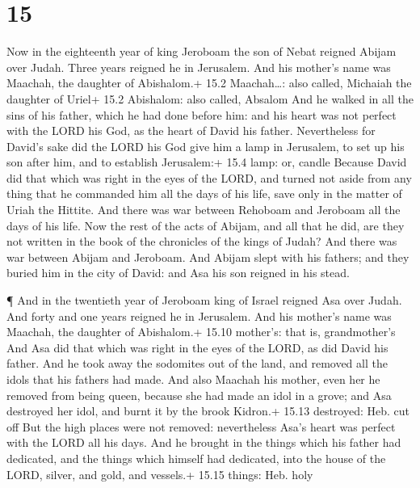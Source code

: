 \hypertarget{section-14}{%
\section{15}\label{section-14}}

 Now in the eighteenth year of king Jeroboam the son of
Nebat reigned Abijam over Judah.  Three years reigned he in
Jerusalem. And his mother's name was Maachah, the daughter of
Abishalom.+ 15.2 Maachah\ldots: also called, Michaiah the daughter of
Uriel+ 15.2 Abishalom: also called, Absalom  And he walked
in all the sins of his father, which he had done before him: and his
heart was not perfect with the LORD his God, as the heart of David his
father.  Nevertheless for David's sake did the LORD his God
give him a lamp in Jerusalem, to set up his son after him, and to
establish Jerusalem:+ 15.4 lamp: or, candle  Because David
did that which was right in the eyes of the LORD, and turned not aside
from any thing that he commanded him all the days of his life, save only
in the matter of Uriah the Hittite.  And there was war
between Rehoboam and Jeroboam all the days of his life.  Now
the rest of the acts of Abijam, and all that he did, are they not
written in the book of the chronicles of the kings of Judah? And there
was war between Abijam and Jeroboam.  And Abijam slept with
his fathers; and they buried him in the city of David: and Asa his son
reigned in his stead.

 ¶ And in the twentieth year of Jeroboam king of Israel
reigned Asa over Judah.  And forty and one years reigned he
in Jerusalem. And his mother's name was Maachah, the daughter of
Abishalom.+ 15.10 mother's: that is, grandmother's  And Asa
did that which was right in the eyes of the LORD, as did David his
father.  And he took away the sodomites out of the land,
and removed all the idols that his fathers had made.  And
also Maachah his mother, even her he removed from being queen, because
she had made an idol in a grove; and Asa destroyed her idol, and burnt
it by the brook Kidron.+ 15.13 destroyed: Heb. cut off  But
the high places were not removed: nevertheless Asa's heart was perfect
with the LORD all his days.  And he brought in the things
which his father had dedicated, and the things which himself had
dedicated, into the house of the LORD, silver, and gold, and vessels.+
15.15 things: Heb. holy

